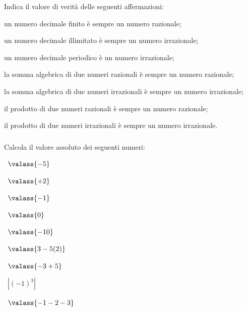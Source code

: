 
\begin{esercizio}
\label{ese:1.7}
Indica il valore di verità delle seguenti affermazioni:
\begin{enumeratea}
\item un numero decimale finito è sempre un numero razionale;
\item un numero decimale illimitato è sempre un numero irrazionale;
\item un numero decimale periodico è un numero irrazionale;
\item la somma algebrica di due numeri razionali è sempre un numero 
razionale;
\item la somma algebrica di due numeri irrazionali è sempre un numero 
irrazionale;
\item il prodotto di due numeri razionali è sempre un numero razionale;
\item il prodotto di due numeri irrazionali è sempre un numero irrazionale.
\end{enumeratea}
\end{esercizio}

\subsubsection*{}

\begin{esercizio}
\label{ese:1.8}
 Calcola il valore assoluto dei seguenti numeri:
\begin{multicols}{3}
 \begin{enumeratea}
 \item~\(\valass{-5}\)
 \item~\(\valass{+2}\)
 \item~\(\valass{-1}\)
 \item~\(\valass{0}\)
 \item~\(\valass{-10}\)
 \item~\(\valass{3-5(2)}\)
 \item~\(\valass{-3+5}\)
 \item~\(\left|{(-1)^3}\right|\)
 \item~\(\valass{-1-2-3}\)
 \end{enumeratea}
 \end{multicols}
\end{esercizio}

